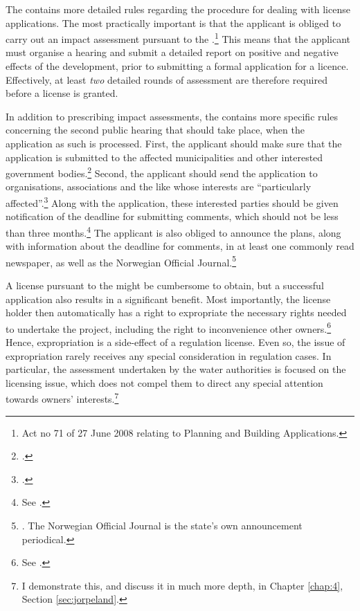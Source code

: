 The \cite{wra17} contains more detailed rules regarding the procedure for dealing with license applications. The most practically important is that the applicant is obliged to carry out an impact assessment pursuant to the \cite{pb08}.\footnote{Act no 71 of 27 June 2008 relating to Planning and Building Applications.} This means that the applicant must organise a hearing and submit a detailed report on positive and negative effects of the development, prior to submitting a formal application for a licence. Effectively, at least {\it two} detailed rounds of assessment are therefore required before a license is granted. %

In addition to prescribing impact assessments, the \cite{wra17} contains more specific rules concerning the second public hearing that should take place, when the application as such is processed. First, the applicant should make sure that the application is submitted to the affected municipalities and other interested government bodies.\footcite[6]{wra17} Second, the applicant should send the application to organisations, associations and the like whose interests are ``particularly affected''.\footcite[6]{wra17} Along with the application, these interested parties should be given notification of the deadline for submitting comments, which should not be less than three months.\footnote{See \cite[6]{wra17}.} The applicant is also obliged to announce the plans, along with information about the deadline for comments, in at least one commonly read newspaper, as well as the Norwegian Official Journal.\footnote{\cite[6]{wra17}. The Norwegian Official Journal is the state's own announcement periodical.} %

A license pursuant to the \cite{wra17} might be cumbersome to obtain, but a successful application also results in a significant benefit. Most importantly, the license holder then automatically has a right to expropriate the necessary rights needed to undertake the project, including the right to inconvenience other owners.\footnote{See \cite[16]{wra17}.} Hence, expropriation is a side-effect of a regulation license. Even so, the issue of expropriation rarely receives any special consideration in regulation cases. In particular, the assessment undertaken by the water authorities is focused on the licensing issue, which does not compel them to direct any special attention towards owners' interests.\footnote{I demonstrate this, and discuss it in much more depth, in Chapter \ref{chap:4}, Section \ref{sec:jorpeland}.}

